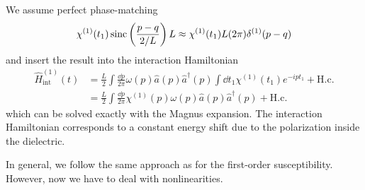 We assume perfect phase-matching
\begin{equation}
	\chi^{(1)}(t_1)
	\operatorname{sinc}\left(\frac{p-q}{2/L}\right)
	L
	\approx
	\chi^{(1)}(t_1)L
	(2\pi)
	\delta^{(1)}(p-q)
\end{equation}
and insert the result into the interaction Hamiltonian
\begin{equation}
	\begin{split}
		\hat{H}_\text{int}^{(1)}(t)
		&=
		\frac{L}{2}
		\int\frac{\dd{p}}{2\pi}
		\omega(p)
		\hat{a}(p)
		\hat{a}^\dagger(p)
		\int\dd{t_1}
		\chi^{(1)}(t_1)
		e^{-ipt_1}
		+
		\text{H.c.}
		\\
		&=
		\frac{L}{2}
		\int\frac{\dd{p}}{2\pi}
		\chi^{(1)}(p)
		\omega(p)
		\hat{a}(p)
		\hat{a}^\dagger(p)
		+
		\text{H.c.}
	\end{split}
\end{equation}
which can be solved exactly with the Magnus expansion.
The interaction Hamiltonian corresponds to a constant energy shift due to the polarization inside the dielectric.

In general, we follow the same approach as for the first-order susceptibility.
However, now we have to deal with nonlinearities.

